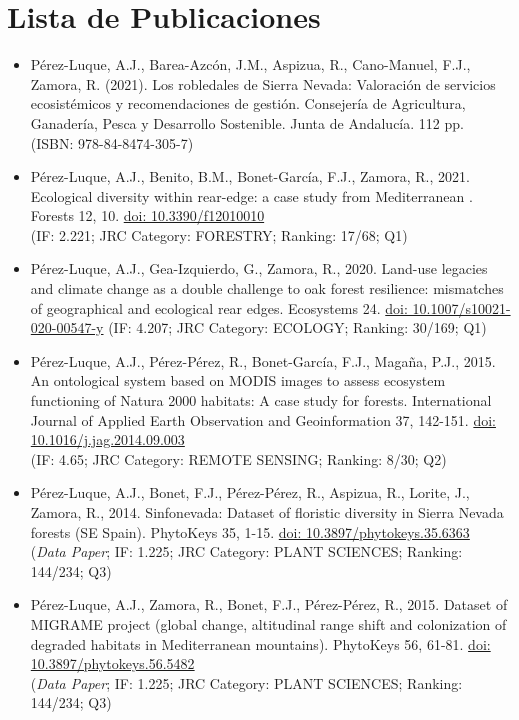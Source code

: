 %
\pagestyle{empty}
\hfill

\section*{Lista de Publicaciones}

\begin{itemize}
    \item Pérez-Luque, A.J., Barea-Azcón, J.M., Aspizua, R., Cano-Manuel, F.J., Zamora, R. (2021). Los robledales de Sierra Nevada: Valoración de servicios ecosistémicos y recomendaciones de gestión. Consejería de Agricultura, Ganadería, Pesca y Desarrollo Sostenible. Junta de Andalucía. 112 pp.\\ 
    (ISBN: 978-84-8474-305-7) 
    \item Pérez-Luque, A.J., Benito, B.M., Bonet-García, F.J., Zamora, R., 2021. Ecological diversity within rear-edge: a case study from Mediterranean \Qpw. Forests 12, 10. \href{https://doi.org/10.3390/f12010010}{doi: 10.3390/f12010010} \\ 
    (IF: 2.221; JRC Category: FORESTRY; Ranking: 17/68; Q1) 
    \item Pérez-Luque, A.J., Gea-Izquierdo, G., Zamora, R., 2020. Land-use legacies and climate change as a double challenge to oak forest resilience: mismatches of geographical and ecological rear edges. Ecosystems 24. \href{https://doi.org/10.1007/s10021-020-00547-y}{doi: 10.1007/s10021-020-00547-y}
    (IF: 4.207; JRC Category: ECOLOGY; Ranking: 30/169; Q1)
    \item Pérez-Luque, A.J., Pérez-Pérez, R., Bonet-García, F.J., Magaña, P.J., 2015. An ontological system based on MODIS images to assess ecosystem functioning of Natura 2000 habitats: A case study for \Qp forests. International Journal of Applied Earth Observation and Geoinformation 37, 142-151. \href{https://doi.org/10.1016/j.jag.2014.09.003}{doi: 10.1016/j.jag.2014.09.003} \\
    (IF: 4.65; JRC Category: REMOTE SENSING; Ranking: 8/30; Q2)
    \item Pérez-Luque, A.J., Bonet, F.J., Pérez-Pérez, R., Aspizua, R., Lorite, J., Zamora, R., 2014. Sinfonevada: Dataset of floristic diversity in Sierra Nevada forests (SE Spain). PhytoKeys 35, 1-15. \href{https://doi.org/10.3897/phytokeys.35.6363}{doi: 10.3897/phytokeys.35.6363}\\
    (\emph{Data Paper}; IF: 1.225; JRC Category: PLANT SCIENCES; Ranking: 144/234; Q3)
    \item Pérez-Luque, A.J., Zamora, R., Bonet, F.J., Pérez-Pérez, R., 2015. Dataset of MIGRAME project (global change, altitudinal range shift and colonization of degraded habitats in Mediterranean mountains). PhytoKeys 56, 61-81. \href{https://doi.org/10.3897/phytokeys.56.5482}{doi: 10.3897/phytokeys.56.5482}\\
    (\emph{Data Paper}; IF: 1.225; JRC Category: PLANT SCIENCES; Ranking: 144/234; Q3)
\end{itemize}




